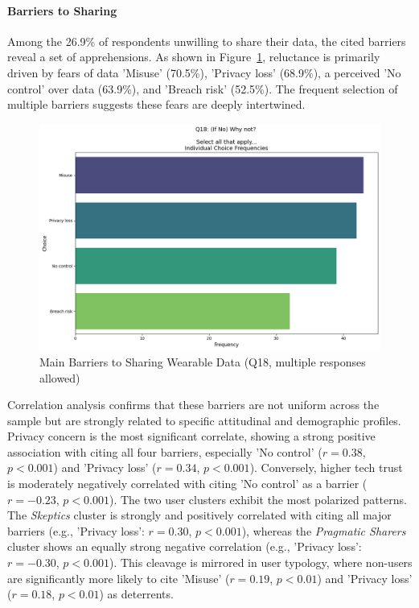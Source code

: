 		\paragraph{Barriers to Sharing}
		Among the 26.9\% of respondents unwilling to share their data, the cited barriers reveal a set of apprehensions. As shown in Figure~\ref{fig:Q18_barriers}, reluctance is primarily driven by fears of data 'Misuse' (70.5\%), 'Privacy loss' (68.9\%), a perceived 'No control' over data (63.9\%), and 'Breach risk' (52.5\%). The frequent selection of multiple barriers suggests these fears are deeply intertwined.
		\begin{figure}[ht]\centering
			\includegraphics[width=1\linewidth]{figures/questions/Q18_multiple_choice.png}
			\caption{Main Barriers to Sharing Wearable Data (Q18, multiple responses allowed)}
			\label{fig:Q18_barriers}
		\end{figure}
		Correlation analysis confirms that these barriers are not uniform across the sample but are strongly related to specific attitudinal and demographic profiles. Privacy concern is the most significant correlate, showing a strong positive association with citing all four barriers, especially 'No control' ($r = 0.38$, $p < 0.001$) and 'Privacy loss' ($r = 0.34$, $p < 0.001$). Conversely, higher tech trust is moderately negatively correlated with citing 'No control' as a barrier ($r = -0.23$, $p < 0.001$).
		The two user clusters exhibit the most polarized patterns. The \textit{Skeptics} cluster is strongly and positively correlated with citing all major barriers (e.g., 'Privacy loss': $r = 0.30$, $p < 0.001$), whereas the \textit{Pragmatic Sharers} cluster shows an equally strong negative correlation (e.g., 'Privacy loss': $r = -0.30$, $p < 0.001$). This cleavage is mirrored in user typology, where non-users are significantly more likely to cite 'Misuse' ($r = 0.19$, $p < 0.01$) and 'Privacy loss' ($r = 0.18$, $p < 0.01$) as deterrents.
